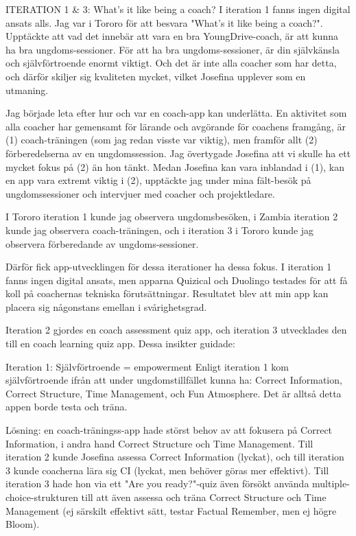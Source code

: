 ITERATION 1 \& 3: What's it like being a coach?
I iteration 1 fanns ingen digital ansats alls. Jag var i Tororo för att besvara "What's it like being a coach?". Upptäckte att vad det innebär att vara en bra YoungDrive-coach, är att kunna ha bra ungdoms-sessioner. För att ha bra ungdoms-sessioner, är din självkänsla och självförtroende enormt viktigt. Och det är inte alla coacher som har detta, och därför skiljer sig kvaliteten mycket, vilket Josefina upplever som en utmaning.

Jag började leta efter hur och var en coach-app kan underlätta. En aktivitet som alla coacher har gemensamt för lärande och avgörande för coachens framgång, är (1) coach-träningen (som jag redan visste var viktig), men framför allt (2) förberedelserna av en ungdomssession. Jag övertygade Josefina att vi skulle ha ett mycket fokus på (2) än hon tänkt. Medan Josefina kan vara inblandad i (1), kan en app vara extremt viktig i (2), upptäckte jag under mina fält-besök på ungdomssessioner och intervjuer med coacher och projektledare.

I Tororo iteration 1 kunde jag observera ungdomsbesöken, i Zambia iteration 2 kunde jag observera coach-träningen, och i iteration 3 i Tororo kunde jag observera förberedande av ungdoms-sessioner.

Därför fick app-utvecklingen för dessa iterationer ha dessa fokus. I iteration 1 fanns ingen digital ansats, men apparna Quizical och Duolingo testades för att få koll på coachernas tekniska förutsättningar. Resultatet blev att min app kan placera sig någonstans emellan i svårighetsgrad.

Iteration 2 gjordes en coach assessment quiz app, och iteration 3 utvecklades den till en coach learning quiz app. Dessa insikter guidade:

Iteration 1: Självförtroende = empowerment
Enligt iteration 1 kom självförtroende ifrån att under ungdomstillfället kunna ha: Correct Information, Correct Structure, Time Management, och Fun Atmosphere. Det är alltså detta appen borde testa och träna.

Lösning: en coach-träningss-app hade störst behov av att fokusera på Correct Information, i andra hand Correct Structure och Time Management. Till iteration 2 kunde Josefina assessa Correct Information (lyckat), och till iteration 3 kunde coacherna lära sig CI (lyckat, men behöver göras mer effektivt). Till iteration 3 hade hon via ett "Are you ready?"-quiz även försökt använda multiple-choice-strukturen till att även assessa och träna Correct Structure och Time Management (ej särskilt effektivt sätt, testar Factual Remember, men ej högre Bloom).

